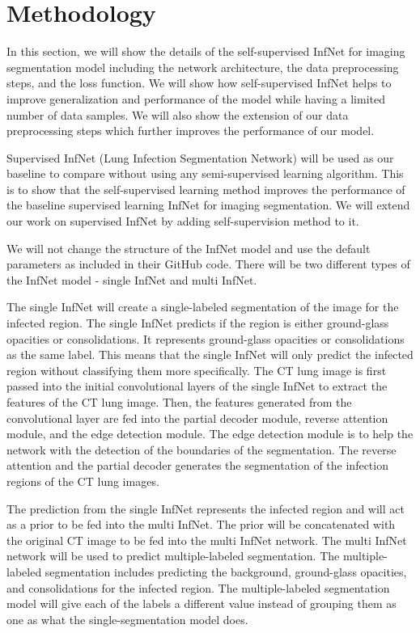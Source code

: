 \section{Methodology}


In this section, we will show the details of the self-supervised InfNet for imaging segmentation model including the network architecture, the data preprocessing steps, and the loss function. We will show how self-supervised InfNet helps to improve generalization and performance of the model while having a limited number of data samples. We will also show the extension of our data preprocessing steps which further improves the performance of our model.

Supervised InfNet (Lung Infection Segmentation Network) will be used as our baseline to compare without using any semi-supervised learning algorithm. This is to show that the self-supervised learning method improves the performance of the baseline supervised learning InfNet for imaging segmentation. We will extend our work on supervised InfNet by adding self-supervision method to it.

We will not change the structure of the InfNet model and use the default parameters as included in their GitHub code. There will be two different types of the InfNet model - single InfNet and multi InfNet. 

The single InfNet will create a single-labeled segmentation of the image for the infected region. The single InfNet predicts if the region is either ground-glass opacities or consolidations. It represents ground-glass opacities or consolidations as the same label. This means that the single InfNet will only predict the infected region without classifying them more specifically.  The CT lung image is first passed into the initial convolutional layers of the single InfNet to extract the features of the CT lung image. Then, the features generated from the convolutional layer are fed into the partial decoder module, reverse attention module, and the edge detection module. The edge detection module is to help the network with the detection of the boundaries of the segmentation. The reverse attention and the partial decoder generates the segmentation of the infection regions of the CT lung images.

The prediction from the single InfNet represents the infected region and will act as a prior to be fed into the multi InfNet. The prior will be concatenated with the original CT image to be fed into the multi InfNet network. The multi InfNet network will be used to predict multiple-labeled segmentation. The multiple-labeled segmentation includes predicting the background, ground-glass opacities, and consolidations for the infected region. The multiple-labeled segmentation model will give each of the labels a different value instead of grouping them as one as what the single-segmentation model does.

